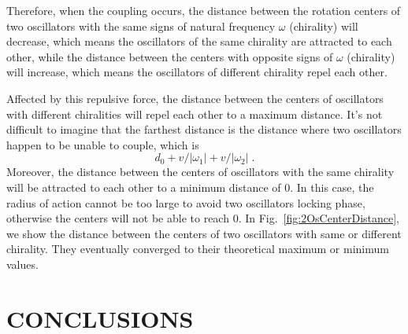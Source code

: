 \documentclass[%
 aip,
 amsmath,amssymb,
 reprint,%
]{revtex4-1}
\begin{document}
Therefore, when the coupling occurs, the distance between the rotation centers of two oscillators with the same signs of natural frequency $\omega$ (chirality) will decrease, which means the oscillators of the same chirality are attracted to each other, while the distance between the centers with opposite signs of $\omega$ (chirality) will increase, which means the oscillators of different chirality repel each other.

Affected by this repulsive force, the distance between the centers of oscillators with different chiralities will repel each other to a maximum distance. It's not difficult to imagine that the farthest distance is the distance where two oscillators happen to be unable to couple, which is 
\begin{equation}\label{eq:maxDistance}
    d_0+v/\left| \omega _1 \right|+v/\left| \omega _2 \right|\;.
\end{equation}
Moreover, the distance between the centers of oscillators with the same chirality will be attracted to each other to a minimum distance of $0$. In this case, the radius of action cannot be too large to avoid two oscillators locking phase, otherwise the centers will not be able to reach $0$.
In Fig.~\ref{fig:2OsCenterDistance}, we show the distance between the centers of two oscillators with same or different chirality. They eventually converged to their theoretical maximum or minimum values.

\section{\label{sec:conclusions}CONCLUSIONS}
\end{document}

